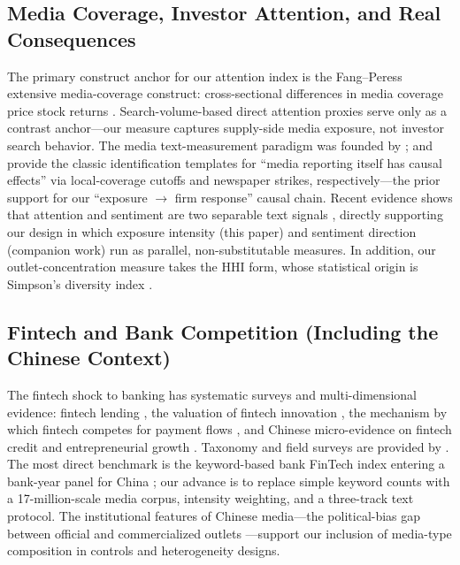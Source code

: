 \subsection{Media Coverage, Investor Attention, and Real Consequences}
The primary construct anchor for our attention index is the Fang--Peress
extensive media-coverage construct: cross-sectional differences in media
coverage price stock returns \parencite{fang2009media}. Search-volume-based
direct attention proxies \parencite{da2011attention} serve only as a contrast
anchor---our measure captures supply-side media exposure, not investor search
behavior. The media text-measurement paradigm was founded by
\textcite{tetlock2007content}; \textcite{engelberg2011causal} and
\textcite{peress2014strikes} provide the classic identification templates for
``media reporting itself has causal effects'' via local-coverage cutoffs and
newspaper strikes, respectively---the prior support for our ``exposure $\to$
firm response'' causal chain. Recent evidence shows that attention and
sentiment are two separable text signals \parencite{cookson2024social},
directly supporting our design in which exposure intensity (this paper) and
sentiment direction (companion work) run as parallel, non-substitutable
measures. In addition, our outlet-concentration measure
 takes the HHI form, whose statistical origin is
Simpson's diversity index \parencite{simpson1949diversity}.

\subsection{Fintech and Bank Competition (Including the Chinese Context)}
The fintech shock to banking has systematic surveys and multi-dimensional
evidence: fintech lending \parencite{berg2022fintechlending}, the valuation of
fintech innovation \parencite{chen2019fintechvalue}, the mechanism by which
fintech competes for payment flows \parencite{parlour2022payment}, and Chinese
micro-evidence on fintech credit and entrepreneurial growth
\parencite{hau2024fintechcredit}. Taxonomy and field surveys are provided by
\parencite{gomber2018fintech,goldstein2019fintech}. The most direct benchmark
is the keyword-based bank FinTech index entering a bank-year panel for China
\parencite{cheng2020bankfintech}; our advance is to replace simple keyword
counts with a 17-million-scale media corpus, intensity weighting, and a
three-track text protocol. The institutional features of Chinese media---the
political-bias gap between official and commercialized outlets
\parencite{qin2018mediabias}---support our inclusion of media-type composition
in controls and heterogeneity designs.

